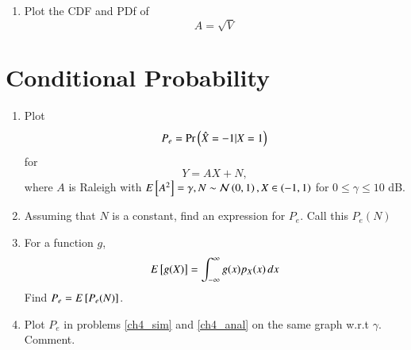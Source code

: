 \documentclass[journal,12pt,twocolumn]{IEEEtran}
\renewcommand\thesection{\arabic{section}}
\begin{document}
\begin{enumerate}[label=\thesection.\arabic*,ref=\thesection.\theenumi]
\begin{enumerate}[label=\thesection.\arabic*
,ref=\thesection.\theenumi]
%
\item
\label{ch3_raleigh_sim}
Plot the CDF and PDf of
%
\begin{equation}
A = \sqrt{V}
\end{equation}
%
\end{enumerate}
\section{Conditional Probability}
\begin{enumerate}[label=\thesection.\arabic*
,ref=\thesection.\theenumi]
\item
\label{ch4_sim}
Plot
\begin{equation}
P_e = \Pr\left(\hat{X} = -1|X=1\right)
\end{equation}
%
for
\begin{equation}
Y = AX+N,
\end{equation}
where $A$ is Raleigh with $E{}\left[A^2\right] = \gamma, N \sim \mathcal{N}\left(0,1\right), X \in \left(-1,1\right)$ for $0 \le \gamma \le 10$ dB.
%
\item
Assuming that $N$ is a constant, find an expression for $P_e$.  Call this $P_e(N)$
%
\item
%
\label{ch4_anal}
For a function $g$,
\begin{equation}
E{}\left[g(X)\right] = \int_{-\infty}^{\infty}g(x)p_{X}(x)\, dx
\end{equation}
%
Find $P_e = E{}\left[P_e(N)\right]$.
%
\item
Plot $P_e$ in problems \ref{ch4_sim} and \ref{ch4_anal} on the same graph w.r.t $\gamma$.  Comment.
		\end{enumerate}

\end{enumerate}
\end{document}
